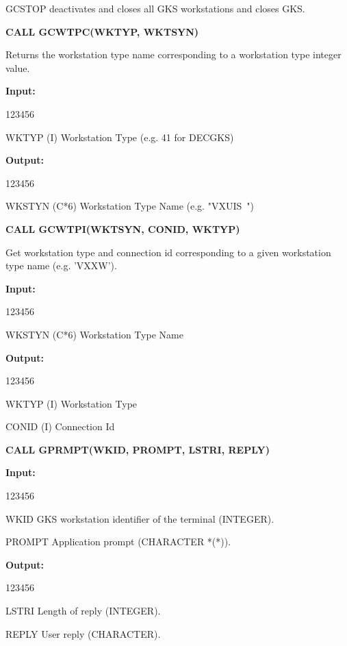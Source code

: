 \begin{OL}
GCSTOP deactivates and closes all GKS workstations and closes GKS.
\item {\bf CALL GCWTPC(WKTYP, WKTSYN)}
 
Returns the workstation type name corresponding to a workstation
type integer value.
 
{\bf Input:}
\begin{DLtt}{123456}
\item[WKTYP (I)]Workstation Type (e.g. 41 for DECGKS)
\end{DLtt}
 
{\bf Output:}
\begin{DLtt}{123456}
\item[WKSTYN (C*6)]Workstation Type Name (e.g. "VXUIS~")
\end{DLtt}
\item {\bf CALL GCWTPI(WKTSYN, CONID, WKTYP)}
 
Get workstation type and connection id corresponding to a given
workstation type name (e.g. 'VXXW').
 
{\bf Input:}
\begin{DLtt}{123456}
\item[WKSTYN (C*6)]Workstation Type Name
\end{DLtt}
 
{\bf Output:}
\begin{DLtt}{123456}
\item[WKTYP (I)]Workstation Type
\item[CONID (I)]Connection Id
\end{DLtt}
\item {\bf CALL GPRMPT(WKID, PROMPT, LSTRI, REPLY)}
 
{\bf Input:}
\begin{DLtt}{123456}
\item[WKID]GKS workstation identifier of the terminal (INTEGER).
\item[PROMPT]Application prompt (CHARACTER *(*)).
\end{DLtt}
 
{\bf Output:}
\begin{DLtt}{123456}
\item[LSTRI]Length of reply (INTEGER).
\item[REPLY]User reply (CHARACTER).
\end{DLtt}
 

\end{OL}
